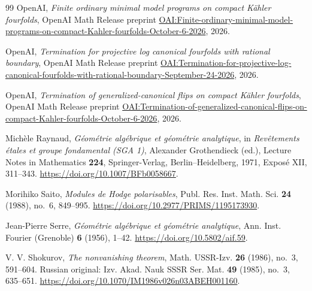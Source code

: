 \begin{thebibliography}{99}
OpenAI,
\emph{Finite ordinary minimal model programs on compact K\"ahler fourfolds},
OpenAI Math Release preprint
\href{https://github.com/openai/math/blob/main/preprints/Finite-ordinary-minimal-model-programs-on-compact-Kahler-fourfolds-October-6-2026/paper.pdf}{OAI:Finite-ordinary-minimal-model-programs-on-compact-Kahler-fourfolds-October-6-2026},
2026.

OpenAI,
\emph{Termination for projective log canonical fourfolds with rational boundary},
OpenAI Math Release preprint
\href{https://github.com/openai/math/blob/main/preprints/Termination-for-projective-log-canonical-fourfolds-with-rational-boundary-September-24-2026/paper.pdf}{OAI:Termination-for-projective-log-canonical-fourfolds-with-rational-boundary-September-24-2026},
2026.

OpenAI,
\emph{Termination of generalized-canonical flips on compact K\"ahler fourfolds},
OpenAI Math Release preprint
\href{https://github.com/openai/math/blob/main/preprints/Termination-of-generalized-canonical-flips-on-compact-Kahler-fourfolds-October-6-2026/termination-generalized-terminal-flips-compact-kahler-fourfolds.pdf}{OAI:Termination-of-generalized-canonical-flips-on-compact-Kahler-fourfolds-October-6-2026},
2026.

Mich\`ele Raynaud,
\emph{G\'eom\'etrie alg\'ebrique et g\'eom\'etrie analytique},
in \emph{Rev\^etements \'etales et groupe fondamental (SGA 1)},
Alexander Grothendieck (ed.), Lecture Notes in Mathematics \textbf{224},
Springer-Verlag, Berlin--Heidelberg, 1971, Expos\'e XII, 311--343.
\url{https://doi.org/10.1007/BFb0058667}.

Morihiko Saito,
\emph{Modules de Hodge polarisables},
Publ. Res. Inst. Math. Sci. \textbf{24} (1988), no.~6, 849--995.
\url{https://doi.org/10.2977/PRIMS/1195173930}.

Jean-Pierre Serre,
\emph{G\'eom\'etrie alg\'ebrique et g\'eom\'etrie analytique},
Ann. Inst. Fourier (Grenoble) \textbf{6} (1956), 1--42.
\url{https://doi.org/10.5802/aif.59}.

V. V. Shokurov,
\emph{The nonvanishing theorem},
Math. USSR-Izv. \textbf{26} (1986), no.~3, 591--604.
Russian original: Izv. Akad. Nauk SSSR Ser. Mat. \textbf{49} (1985),
no.~3, 635--651.
\url{https://doi.org/10.1070/IM1986v026n03ABEH001160}.

\end{thebibliography}
